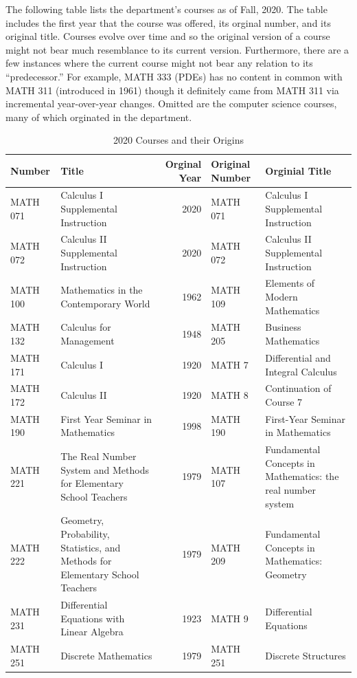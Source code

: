\documentclass[
]{book}
\begin{document}
The following table lists the department's courses as of Fall, 2020. The table includes the first year that the course was offered, its orginal number, and its original title. Courses evolve over time and so the original version of a course might not bear much resemblance to its current version. Furthermore, there are a few instances where the current course might not bear any relation to its ``predecessor.'' For example, MATH 333 (PDEs) has no content in common with MATH 311 (introduced in 1961) though it definitely came from MATH 311 via incremental year-over-year changes. Omitted are the computer science courses, many of which orginated in the department.

\begin{table}

\caption{\label{tab:willem}2020 Courses and their Origins}
\centering
\begin{tabular}[t]{llrll}
\toprule
Number & Title & Orginal Year & Original Number & Orginial Title\\
\midrule
MATH 071 & Calculus I Supplemental Instruction & 2020 & MATH 071 & Calculus I Supplemental Instruction\\
MATH 072 & Calculus II Supplemental Instruction & 2020 & MATH 072 & Calculus II Supplemental Instruction\\
MATH 100 & Mathematics in the Contemporary World & 1962 & MATH 109 & Elements of Modern Mathematics\\
MATH 132 & Calculus for Management & 1948 & MATH 205 & Business Mathematics\\
MATH 171 & Calculus I & 1920 & MATH 7 & Differential and Integral Calculus\\
\addlinespace
MATH 172 & Calculus II & 1920 & MATH 8 & Continuation of Course 7\\
MATH 190 & First Year Seminar in Mathematics & 1998 & MATH 190 & First-Year Seminar in Mathematics\\
MATH 221 & The Real Number System and Methods for Elementary School Teachers & 1979 & MATH 107 & Fundamental Concepts in Mathematics: the real number system\\
MATH 222 & Geometry, Probability, Statistics, and Methods for Elementary School Teachers & 1979 & MATH 209 & Fundamental Concepts in Mathematics: Geometry\\
MATH 231 & Differential Equations with Linear Algebra & 1923 & MATH 9 & Differential Equations\\
\addlinespace
MATH 251 & Discrete Mathematics & 1979 & MATH 251 & Discrete Structures\\

\end{tabular}
\end{table}
\end{document}
